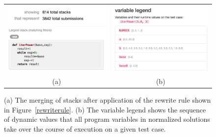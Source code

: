 \documentclass[12pt,twoside]{mitthesis}
\begin{document}
\begin{figure}[htpb]
\begin{tabular}{c | c}
\begin{minipage}{.5\linewidth}
\centering
\includegraphics[scale=0.4]{Body/figures/overcode/afterrewrite.png}
\end{minipage}
&
\begin{minipage}{.5\linewidth}
\centering
\includegraphics[scale=0.4]{Body/figures/overcode/variableLegend.png}
\end{minipage}
\\
(a) & (b)
\end{tabular}
\caption{(a) The merging of stacks after application of the rewrite rule shown in Figure~\ref{rewriterule}. (b) The variable legend shows the sequence of dynamic values that all program variables in normalized solutions take over the course of execution on a given test case.}
\label{afterrewrite}
\end{figure}
\end{document}
